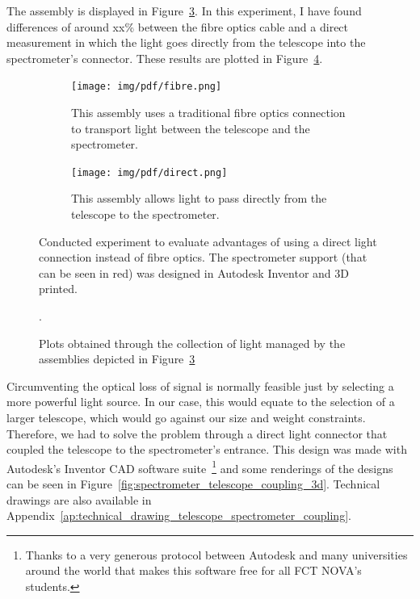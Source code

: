 The assembly is displayed in Figure~\ref{fig:direct_vs_optical_assmbly}.
In this experiment, I have found differences of around xx\% between the fibre optics cable and a direct measurement in
which the light goes directly from the telescope into the spectrometer's
connector. These results are plotted in
Figure~\ref{fig:direct_vs_optical_plot}.

\begin{figure}[htpb]
    \centering
    \begin{subfigure}{.45\textwidth}
        \texttt{[image: img/pdf/fibre.png]}
        \caption{This assembly uses a traditional fibre optics
        connection to transport light between the telescope and the
        spectrometer.}
        \label{fig:fo_light}
    \end{subfigure}
    \hfill
    \begin{subfigure}{.45\textwidth}
        \texttt{[image: img/pdf/direct.png]}
        \caption{This assembly allows light to pass directly from the
        telescope to the spectrometer.}
        \label{fig:direct_light}
    \end{subfigure}
    \caption{Conducted experiment to evaluate advantages of using a
    direct light connection instead of fibre optics. The spectrometer
    support (that can be seen in red) was designed in Autodesk Inventor and
    3D printed.}%
    \label{fig:direct_vs_optical_assmbly}
\end{figure}

\begin{figure}[htpb]
    \centering
    \missingfigure{}
    \caption{Plots obtained through the collection of light managed by
    the assemblies depicted in
    Figure~\ref{fig:direct_vs_optical_assmbly}}.%
    \label{fig:direct_vs_optical_plot}
\end{figure}

Circumventing the optical loss of signal is normally feasible just by
selecting a more powerful light source. In our case, this would equate
to the selection of a larger telescope, which would go against our size
and weight constraints. Therefore, we had to solve the problem through a
direct light connector that coupled the telescope to the spectrometer's
entrance. This design was made with Autodesk's Inventor CAD software
suite~\footnote{Thanks to a very generous protocol between Autodesk and
many universities around the world that makes this software free for all
FCT NOVA's students.} and some renderings of the designs can be seen in
Figure~\ref{fig:spectrometer_telescope_coupling_3d}. Technical drawings
are also available in
Appendix~\ref{ap:technical_drawing_telescope_spectrometer_coupling}.

